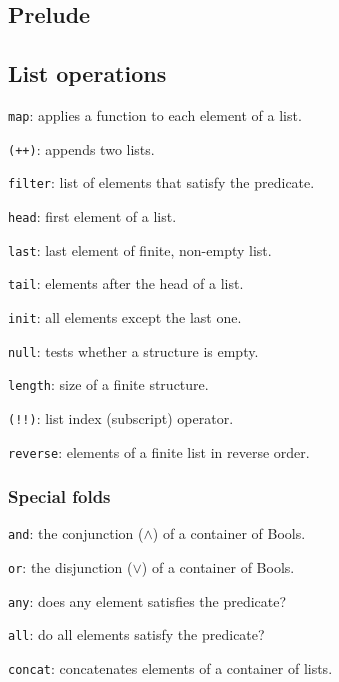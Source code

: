 \documentclass[a4paper, twoside, 8pt]{extarticle}
\begin{document}
\renewcommand{\footrulewidth}{0.4pt}
\fancyfoot[LF]{}

\begin{multicols*}{3}
\section{Prelude}
\subsection{List operations}
\texttt{map}: applies a function to each element of a list.

\texttt{(++)}: appends two lists.

\texttt{filter}: list of elements that satisfy the predicate.

\texttt{head}: first element of a list.

\texttt{last}: last element of finite, non-empty list.

\texttt{tail}: elements after the head of a list.

\texttt{init}: all elements except the last one.

\texttt{null}: tests whether a structure is empty.

\texttt{length}: size of a finite structure.

\texttt{(!!)}: list index (subscript) operator.

\texttt{reverse}: elements of a finite list in reverse order.

\subsubsection{Special folds}
\texttt{and}: the conjunction ($\wedge$) of a container of Bools.

\texttt{or}: the disjunction ($\vee$) of a container of Bools.

\texttt{any}: does any element satisfies the predicate?

\texttt{all}: do all elements satisfy the predicate?

\texttt{concat}: concatenates elements of a container of lists.


\end{multicols*}
\end{document}
